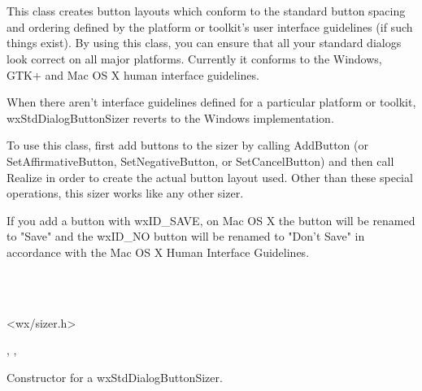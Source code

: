 \section{}\label{wxstddialogbuttonsizer}

This class creates button layouts which conform to the standard button spacing and ordering defined by the platform
or toolkit's user interface guidelines (if such things exist). By using this class, you can ensure that all your
standard dialogs look correct on all major platforms. Currently it conforms to the Windows, GTK+ and Mac OS X
human interface guidelines.

When there aren't interface guidelines defined for a particular platform or toolkit, wxStdDialogButtonSizer reverts
to the Windows implementation. 

To use this class, first add buttons to the sizer by calling AddButton (or SetAffirmativeButton, SetNegativeButton,
or SetCancelButton) and then call Realize in order to create the actual button layout used. Other than these special
operations, this sizer works like any other sizer. 

If you add a button with wxID\_SAVE, on Mac OS X the button will be renamed to "Save" and
the wxID\_NO button will be renamed to "Don't Save" in accordance with the Mac OS X Human Interface Guidelines.


\\
\\


<wx/sizer.h>




, , 



\label{wxstddialogbuttonsizerctor}


Constructor for a wxStdDialogButtonSizer.

\label{wxstddialogbuttonsizeraddbutton}

